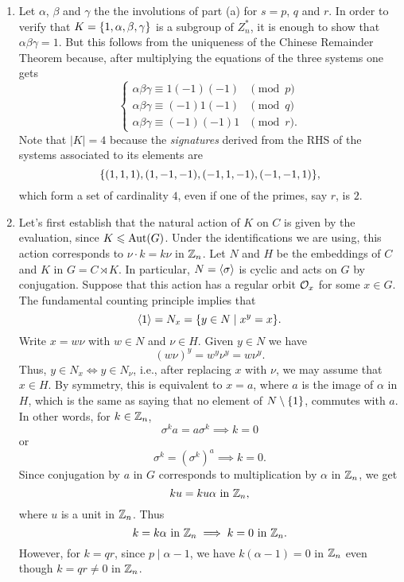 \begin{solution}
\begin{solution}
\begin{enumerate}[\rm a)]
    \item Let $\alpha$, $\beta$ and $\gamma$ the the involutions of part (a) for $s=p$, $q$ and $r$. In order to verify that $K=\{1,\alpha,\beta,\gamma\}$ is a subgroup of $Z_n^*$, it is enough to show that $\alpha\beta\gamma=1$. But this follows from the uniqueness of the Chinese Remainder Theorem because, after multiplying the equations of the three systems one gets
        $$
        \begin{cases}
            \alpha\beta\gamma\equiv1(-1)(-1)&{}\pmod p\\
            \alpha\beta\gamma\equiv(-1)1(-1)&{}\pmod q\\
            \alpha\beta\gamma\equiv(-1)(-1)1&{}\pmod r.
        \end{cases}
    $$
    Note that $|K|=4$ because the \textsl{signatures\/} derived from the RHS of the systems associated to its elements are
    $$
        \{(1,1,1), (1,-1,-1), (-1,1,-1), (-1,-1,1)\},
    $$
    which form a set of cardinality $4$, even if one of the primes, say $r$, is $2$. 

    \item Let's first establish that the natural action of $K$ on $C$ is given by the evaluation, since $K\leqslant{\rm Aut}(G)$. Under the identifications we are using, this action corresponds to $\nu\cdot k=k\nu$ in $\mathbb{Z}_n$. Let $N$ and $H$ be the embeddings of $C$ and $K$ in $G=C\rtimes K$. In particular, $N=\langle\sigma\rangle$ is cyclic and acts on $G$ by conjugation. Suppose that this action has a regular orbit ${\cal O}_x$ for some $x\in G$. The fundamental counting principle implies that
    $$
        \langle1\rangle=N_x=\{y\in N\mid x^y=x\}.
    $$
    Write $x=w\nu$ with $w\in N$ and $\nu\in H$. Given $y\in N$ we have
    $$
        (w\nu)^y = w^y\nu^y=w\nu^y.
    $$
    Thus, $y\in N_x\iff y\in N_\nu$, i.e., after replacing $x$ with $\nu$, we may assume that $x\in H$. By symmetry, this is equivalent to $x=a$, where $a$ is the image of $\alpha$ in $H$, which is the same as saying that no element of $N\setminus\{1\}$, commutes with $a$. In other words, for $k\in\mathbb{Z}_n$,
    $$
        \sigma^ka=a\sigma^k\implies k=0
    $$
    or
    $$
        \sigma^k=(\sigma^k)^a\implies k=0.
    $$
    Since conjugation by $a$ in $G$ corresponds to multiplication by $\alpha$ in $\mathbb{Z}_n$, we get
    $$
        ku=ku\alpha\text{ in }\mathbb{Z}_n,
    $$
    where $u$ is a unit in $\mathbb{Z}_n$. Thus
    $$
        k=k\alpha\text{ in }\mathbb{Z}_n\implies k=0\text{ in }\mathbb{Z}_n.
    $$
    However, for $k=qr$, since $p\mid\alpha-1$, we have $k(\alpha-1)=0$ in $\mathbb{Z}_n$ even though $k=qr\ne0$ in $\mathbb{Z}_n$.
\end{enumerate}
\end{solution}


\end{solution}
